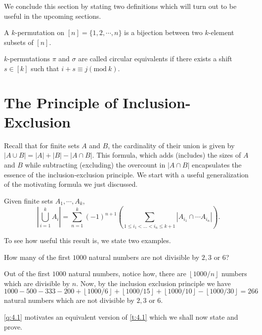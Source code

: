 We conclude this section by stating two definitions which will turn out to be useful in the upcoming sections.
\begin{definition}[$k$-Permutation]
A $k$-permutation on $[n]=\{1,2,\cdots,n\}$ is a bijection between two $k$-element subsets of $[n]$. 
\end{definition}
\begin{definition}
	$k$-permutations  $\pi$ and $\sigma$ are called circular equivalents if there exists a shift  $s\in [k]$ such that  $i+s\equiv j(\text{mod} \ k)$.
\end{definition}
\section{The Principle of Inclusion-Exclusion}
Recall that for finite sets $A$ and $B$, the cardinality of their union is given by $|A \cup B| = |A| + |B| - |A \cap B|
$. This formula, which adds (includes) the sizes of $A$ and $B$ while subtracting (excluding) the overcount in $|A \cap B|$ encapsulates the essence of the inclusion-exclusion principle. We start with a useful generalization of the motivating formula we just discussed.
\begin{theorem}
	Given finite sets $A_{1},\cdots,A_{k}$, 
	\[
		|\bigcup_{i=1}^k A_i| = \sum_{n=1}^{k}\left(-1  \right)^{n+1}\left( \sum_{1\leq i_{1}<\ldots<i_{n}\leq k+1}|A_{i_{1}}\cap \cdots A_{i_{n}}| \right) 
	.\] 
 \label{t:4.1}
\end{theorem}
To see how useful this result is, we state two examples.
\begin{question}
How many of the first $1000$ natural numbers are not divisible by $2,3$ or $6$? \label{q:4.1}
\end{question}
\begin{solution}
Out of the first $1000$ natural numbers, notice how, there are $\left \lfloor{1000/n}\right \rfloor$ numbers which are divisible by $n$. Now, by the inclusion exclusion principle we have 
\[
1000-500-333-200+\left \lfloor{1000/6}\right \rfloor+\left \lfloor{1000/15}\right \rfloor+\left \lfloor{1000/10}\right \rfloor-\left \lfloor{1000/30}\right \rfloor=266
\]
natural numbers which are not divisible by $2,3$ or $6$. 
\end{solution}
\cref{q:4.1} motivates an equivalent version of \cref{t:4.1} which we shall now state and prove.
